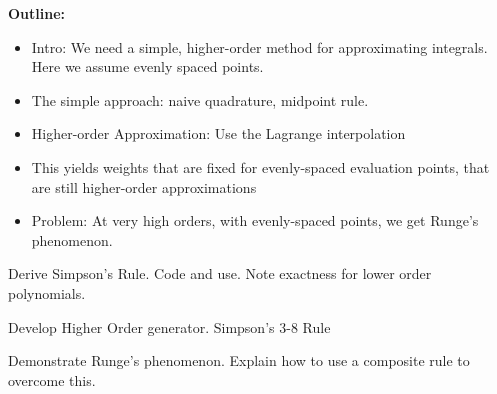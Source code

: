 

{\bf Outline:}
\begin{itemize}
\item Intro: We need a simple, higher-order method for approximating integrals. Here we assume evenly spaced points.
\item The simple approach: naive quadrature, midpoint rule.
\item Higher-order Approximation: Use the Lagrange interpolation
\item This yields weights that are fixed for evenly-spaced evaluation points, that are still higher-order approximations
\item Problem: At very high orders, with evenly-spaced points, we get Runge's phenomenon.
\end{itemize}

\begin{problem}
Derive Simpson's Rule. Code and use. Note exactness for lower order polynomials.
\end{problem}

\begin{problem}
Develop Higher Order generator. Simpson's 3-8 Rule
\end{problem}

\begin{problem}
Demonstrate Runge's phenomenon. Explain how to use a composite rule to overcome this.
\end{problem}
